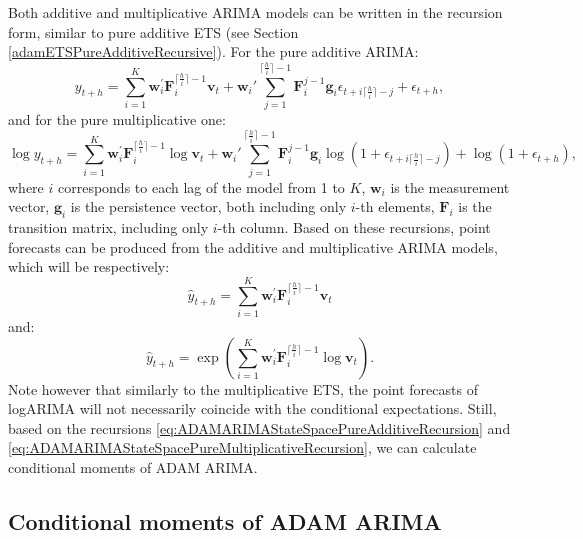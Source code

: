 \documentclass[
]{book}
\theoremstyle{definition}
\theoremstyle{definition}
\theoremstyle{definition}
\theoremstyle{definition}
\theoremstyle{remark}
\begin{document}
Both additive and multiplicative ARIMA models can be written in the recursion form, similar to pure additive ETS (see Section \ref{adamETSPureAdditiveRecursive}). For the pure additive ARIMA:
\begin{equation}
    y_{t+h} = \sum_{i=1}^K \mathbf{w}_{i}^\prime \mathbf{F}_{i}^{\lceil\frac{h}{i}\rceil-1} \mathbf{v}_{t} + \mathbf{w}_{i}' \sum_{j=1}^{\lceil\frac{h}{i}\rceil-1} \mathbf{F}_{i}^{j-1} \mathbf{g}_{i} \epsilon_{t+i\lceil\frac{h}{i}\rceil-j} + \epsilon_{t+h} ,
  \label{eq:ADAMARIMAStateSpacePureAdditiveRecursion}
\end{equation}
and for the pure multiplicative one:
\begin{equation}
    \log y_{t+h} = \sum_{i=1}^K \mathbf{w}_{i}^\prime \mathbf{F}_{i}^{\lceil\frac{h}{i}\rceil-1} \log \mathbf{v}_{t} + \mathbf{w}_{i}' \sum_{j=1}^{\lceil\frac{h}{i}\rceil-1} \mathbf{F}_{i}^{j-1} \mathbf{g}_{i} \log (1+\epsilon_{t+i\lceil\frac{h}{i}\rceil-j}) + \log(1+ \epsilon_{t+h}) ,
  \label{eq:ADAMARIMAStateSpacePureMultiplicativeRecursion}
\end{equation}
where \(i\) corresponds to each lag of the model from 1 to \(K\), \(\mathbf{w}_{i}\) is the measurement vector, \(\mathbf{g}_{i}\) is the persistence vector, both including only \(i\)-th elements, \(\mathbf{F}_{i}\) is the transition matrix, including only \(i\)-th column. Based on these recursions, point forecasts can be produced from the additive and multiplicative ARIMA models, which will be respectively:
\begin{equation}
    \hat{y}_{t+h} = \sum_{i=1}^K \mathbf{w}_{i}^\prime \mathbf{F}_{i}^{\lceil\frac{h}{i}\rceil-1} \mathbf{v}_{t}
  \label{eq:ADAMARIMAStateSpacePureAdditiveForecast}
\end{equation}
and:
\begin{equation}
    \hat{y}_{t+h} = \exp\left(\sum_{i=1}^K \mathbf{w}_{i}^\prime \mathbf{F}_{i}^{\lceil\frac{h}{i}\rceil-1} \log \mathbf{v}_{t} \right) .
  \label{eq:ADAMARIMAStateSpacePureMultiplicativeForecast}
\end{equation}
Note however that similarly to the multiplicative ETS, the point forecasts of logARIMA will not necessarily coincide with the conditional expectations. Still, based on the recursions \eqref{eq:ADAMARIMAStateSpacePureAdditiveRecursion} and \eqref{eq:ADAMARIMAStateSpacePureMultiplicativeRecursion}, we can calculate conditional moments of ADAM ARIMA.

\hypertarget{ADAMARIMARecursiveMoments}{%
\subsection{Conditional moments of ADAM ARIMA}\label{ADAMARIMARecursiveMoments}}
\end{document}
